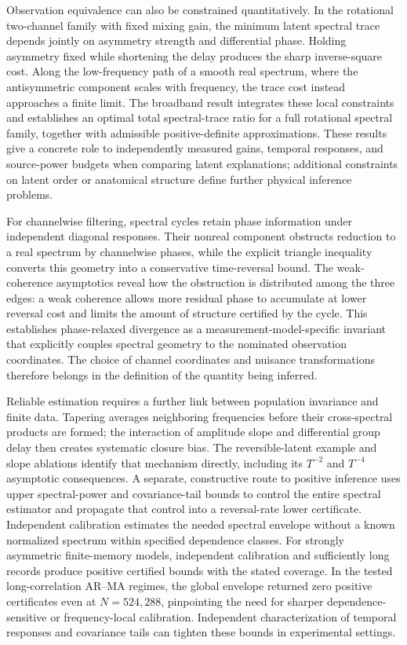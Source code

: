 \documentclass[aps,pre,reprint,amsmath,amssymb,superscriptaddress]{revtex4-2}
\begin{document}
Observation equivalence can also be constrained quantitatively. In the rotational two-channel family with fixed mixing gain, the minimum latent spectral trace depends jointly on asymmetry strength and differential phase. Holding asymmetry fixed while shortening the delay produces the sharp inverse-square cost. Along the low-frequency path of a smooth real spectrum, where the antisymmetric component scales with frequency, the trace cost instead approaches a finite limit. The broadband result integrates these local constraints and establishes an optimal total spectral-trace ratio for a full rotational spectral family, together with admissible positive-definite approximations. These results give a concrete role to independently measured gains, temporal responses, and source-power budgets when comparing latent explanations; additional constraints on latent order or anatomical structure define further physical inference problems.

For channelwise filtering, spectral cycles retain phase information under independent diagonal responses. Their nonreal component obstructs reduction to a real spectrum by channelwise phases, while the explicit triangle inequality converts this geometry into a conservative time-reversal bound. The weak-coherence asymptotics reveal how the obstruction is distributed among the three edges: a weak coherence allows more residual phase to accumulate at lower reversal cost and limits the amount of structure certified by the cycle. This establishes phase-relaxed divergence as a measurement-model-specific invariant that explicitly couples spectral geometry to the nominated observation coordinates. The choice of channel coordinates and nuisance transformations therefore belongs in the definition of the quantity being inferred.

Reliable estimation requires a further link between population invariance and finite data. Tapering averages neighboring frequencies before their cross-spectral products are formed; the interaction of amplitude slope and differential group delay then creates systematic closure bias. The reversible-latent example and slope ablations identify that mechanism directly, including its $T^{-2}$ and $T^{-4}$ asymptotic consequences. A separate, constructive route to positive inference uses upper spectral-power and covariance-tail bounds to control the entire spectral estimator and propagate that control into a reversal-rate lower certificate. Independent calibration estimates the needed spectral envelope without a known normalized spectrum within specified dependence classes. For strongly asymmetric finite-memory models, independent calibration and sufficiently long records produce positive certified bounds with the stated coverage. In the tested long-correlation AR--MA regimes, the global envelope returned zero positive certificates even at $N=524,288$, pinpointing the need for sharper dependence-sensitive or frequency-local calibration. Independent characterization of temporal responses and covariance tails can tighten these bounds in experimental settings.
\end{document}
